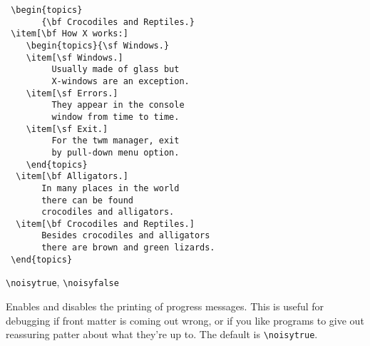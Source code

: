 \begin{minipage}{2.5in}\footnotesize
\begin{verbatim}
 \begin{topics}
       {\bf Crocodiles and Reptiles.}
 \item[\bf How X works:]
    \begin{topics}{\sf Windows.}
    \item[\sf Windows.]
         Usually made of glass but
         X-windows are an exception.
    \item[\sf Errors.]
         They appear in the console
         window from time to time.
    \item[\sf Exit.]
         For the twm manager, exit
         by pull-down menu option.
    \end{topics}
  \item[\bf Alligators.]
       In many places in the world
       there can be found
       crocodiles and alligators.
  \item[\bf Crocodiles and Reptiles.]
       Besides crocodiles and alligators
       there are brown and green lizards.
 \end{topics}
\end{verbatim}
\end{minipage}
%
\hfill
{}


\medskip

\verb|\noisytrue|, \verb|\noisyfalse|

\noindent Enables and disables the printing of progress messages. This
is useful for debugging if front matter is coming out wrong, or if you
like programs to give out reassuring patter about what they're up to.
The default is \verb|\noisytrue|.

